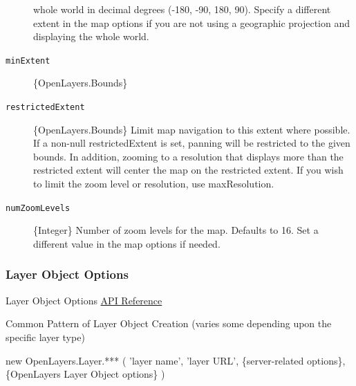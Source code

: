 \documentclass[]{article}
\newenvironment{Shaded}{}{}
\newcommand{\NormalTok}[1]{{#1}}
\begin{document}
\begin{description}
whole world in decimal degrees (-180, -90, 180, 90). Specify a different
extent in the map options if you are not using a geographic projection
and displaying the whole world.
\item[\texttt{minExtent}]
\{OpenLayers.Bounds\}
\item[\texttt{restrictedExtent}]
\{OpenLayers.Bounds\} Limit map navigation to this extent where
possible. If a non-null restrictedExtent is set, panning will be
restricted to the given bounds. In addition, zooming to a resolution
that displays more than the restricted extent will center the map on the
restricted extent. If you wish to limit the zoom level or resolution,
use maxResolution.
\item[\texttt{numZoomLevels}]
\{Integer\} Number of zoom levels for the map. Defaults to 16. Set a
different value in the map options if needed.
\end{description}

\subsubsection{Layer Object Options}\label{layer-object-options}

Layer Object Options
\href{http://dev.openlayers.org/releases/OpenLayers-2.13/doc/apidocs/files/OpenLayers/Layer-js.html}{API
Reference}

Common Pattern of Layer Object Creation (varies some depending upon the
specific layer type)

\begin{Shaded}
\begin{Highlighting}[numbers=left,,]
    \NormalTok{new OpenLayers.Layer.*** (}
        \NormalTok{'layer name',}
        \NormalTok{'layer URL',}
        \NormalTok{\{server-related options\}, }
        \NormalTok{\{OpenLayers Layer Object options\}}
    \NormalTok{)}
\end{Highlighting}
\end{Shaded}
\end{document}
